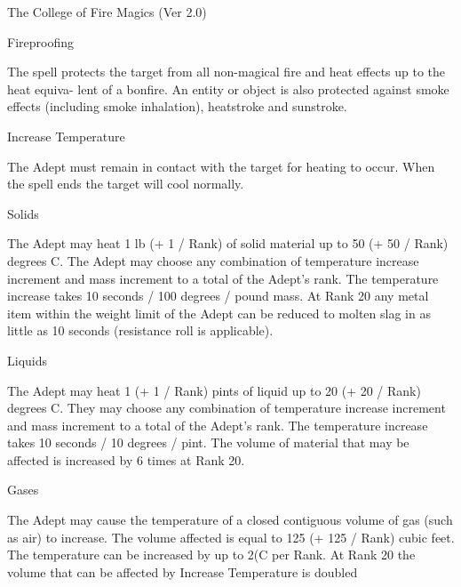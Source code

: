 \begin{Chapter}{The College of Fire Magics (Ver 2.0)}
\begin{spell}[G-5]{Fireproofing}

\begin{effects}
The spell protects the target from all non-magical fire and heat
effects up to the heat equiva- lent of a bonfire.  An entity or object
is also protected against smoke effects (including smoke inhalation),
heatstroke and sunstroke.
\end{effects}
\end{spell}

\begin{spell}[G-6]{Increase Temperature}

\begin{effects}
The Adept must remain in contact with the target for heating to
occur. When the spell ends the target will cool normally.

Solids 



The Adept may heat 1 lb (+ 1 / Rank) of solid material up to 50 (+ 50
/ Rank) degrees C.  The Adept may choose any combination of
temperature increase increment and mass increment to a total of the
Adept’s rank.  The temperature increase takes 10 seconds / 100 degrees
/ pound mass. At Rank 20 any metal item within the weight limit of the
Adept can be reduced to molten slag in as little as 10 seconds
(resistance roll is applicable).

Liquids 


The Adept may heat 1 (+ 1 / Rank) pints of liquid up to 20 (+ 20 /
Rank) degrees C.  They may choose any combination of temperature
increase increment and mass increment to a total of the Adept’s rank.
The temperature increase takes 10 seconds / 10 degrees / pint. The
volume of material that may be affected is increased by 6 times at
Rank 20.

Gases 


The Adept may cause the temperature of a closed contiguous volume of
gas (such as air) to increase.  The volume affected is equal to 125 (+
125 / Rank) cubic feet. The temperature can be increased by up to 2(C
per Rank.  At Rank 20 the volume that can be affected by Increase
Temperature is doubled


\end{effects}
\end{spell}
\end{Chapter}
